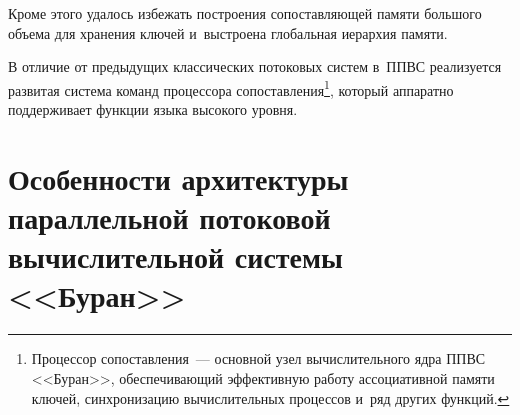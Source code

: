 \begin{multicols}{2}
  Кроме этого удалось избежать построения сопоставляющей памяти большого 
объема для хранения ключей и~выстроена глобальная иерархия памяти.
  
  В отличие от предыдущих классических потоковых систем в~ППВС 
реализуется развитая сис\-те\-ма команд процессора 
сопоставления\footnote{Процессор сопоставления~--- основной узел вычислительного ядра ППВС 
<<Буран>>, обеспечивающий эффективную работу ассоциативной памяти ключей, синхронизацию 
вычислительных процессов и~ряд других функций.}, который аппаратно поддерживает 
функции языка высокого уровня. 
  
\section{Особенности архитектуры параллельной потоковой вычислительной системы 
<<Буран>>}


\end{multicols}
